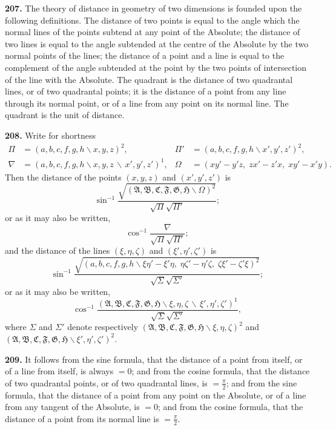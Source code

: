 \documentclass[11pt,a4paper]{book}
\begin{document}
\begin{center}
\textbf{207.} The theory of distance in geometry of two dimensions is founded upon the
following definitions. The distance of two points is equal to the angle which the
normal lines of the points subtend at any point of the Absolute; the distance of two
lines is equal to the angle subtended at the centre of the Absolute by the two normal
points of the lines; the distance of a point and a line is equal to the complement of
the angle subtended at the point by the two points of intersection of the line with
the Absolute. The quadrant is the distance of two quadrantal lines, or of two
quadrantal points; it is the distance of a point from any line through its normal point,
or of a line from any point on its normal line. The quadrant is the unit of distance.

\textbf{208.} Write for shortness
\begin{align*}
\Pi &= (a,b,c,f,g,h\!\backslash x,y,z)^2, & \Pi' &= (a,b,c,f,g,h\!\backslash x',y',z')^2,\\
\nabla &= (a,b,c,f,g,h\!\backslash x,y,z\,\backslash\,x',y',z')^1, & \Omega &= (xy'-y'z,\; zx'-z'x,\; xy'-x'y).
\end{align*}
Then the distance of the points $(x,y,z)$ and $(x',y',z')$ is
\[
\sin^{-1}\frac{\sqrt{(\mathfrak{A},\mathfrak{B},\mathfrak{C},\mathfrak{F},\mathfrak{G},\mathfrak{H}\!\backslash \Omega)^2}}{\sqrt{\Pi}\sqrt{\Pi'}};
\]
or as it may also be written,
\[
\cos^{-1}\frac{\nabla}{\sqrt{\Pi}\sqrt{\Pi'}};
\]
and the distance of the lines $(\xi,\eta,\zeta)$ and $(\xi',\eta',\zeta')$ is
\[
\sin^{-1}\frac{\sqrt{(a,b,c,f,g,h\!\backslash \xi\eta'-\xi'\eta,\; \eta\zeta'-\eta'\zeta,\; \zeta\xi'-\zeta'\xi)^2}}{\sqrt{\Sigma}\sqrt{\Sigma'}};
\]
or as it may also be written,
\[
\cos^{-1}\frac{(\mathfrak{A},\mathfrak{B},\mathfrak{C},\mathfrak{F},\mathfrak{G},\mathfrak{H}\!\backslash \xi,\eta,\zeta\,\backslash\,\xi',\eta',\zeta')^1}{\sqrt{\Sigma}\sqrt{\Sigma'}},
\]
where $\Sigma$ and $\Sigma'$ denote respectively $(\mathfrak{A},\mathfrak{B},\mathfrak{C},\mathfrak{F},\mathfrak{G},\mathfrak{H}\!\backslash \xi,\eta,\zeta)^2$ and
$(\mathfrak{A},\mathfrak{B},\mathfrak{C},\mathfrak{F},\mathfrak{G},\mathfrak{H}\!\backslash \xi',\eta',\zeta')^2$.

\textbf{209.} It follows from the sine formula, that the distance of a point from itself,
or of a line from itself, is always $=0$; and from the cosine formula, that the distance
of two quadrantal points, or of two quadrantal lines, is $=\frac{\pi}{2}$; and from the sine formula,
that the distance of a point from any point on the Absolute, or of a line from any
tangent of the Absolute, is $=0$; and from the cosine formula, that the distance of a
point from its normal line is $=\frac{\pi}{2}$.


\end{center}
\end{document}
